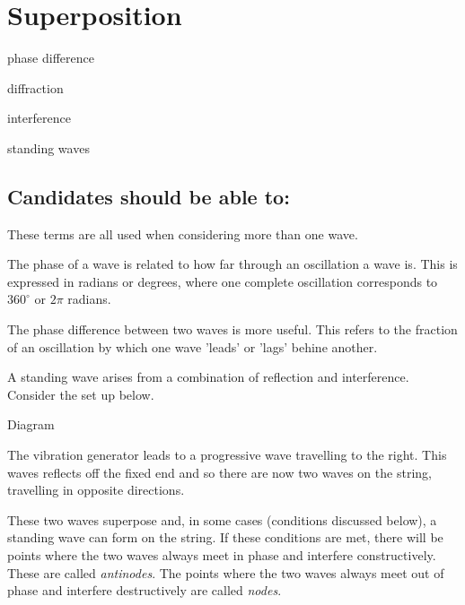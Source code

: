 \documentclass[main.tex]{subfiles}
\begin{document}
\chapter{Superposition}
\begin{content}
\item phase difference
\item diffraction
\item interference
\item standing waves
\end{content}

\section*{Candidates should be able to:}

These terms are all used when considering more than one wave.

The phase of a wave is related to how far through an oscillation a wave is. This is expressed in radians or degrees, where one complete oscillation corresponds to $360^{\circ}$ or $2\pi$ radians.

The phase difference between two waves is more useful. This refers to the fraction of an oscillation by which one wave 'leads' or 'lags' behine another.


A standing wave arises from a combination of reflection and interference. Consider the set up below. 

Diagram

The vibration generator leads to a progressive wave travelling to the right. This waves reflects off the fixed end and so there are now two waves on the string, travelling in opposite directions. 

These two waves superpose and, in some cases (conditions discussed below), a standing wave can form on the string. If these conditions are met, there will be points where the two waves always meet in phase and interfere constructively. These are called \emph{antinodes}. The points where the two waves always meet out of phase and interfere destructively are called \emph{nodes}.
\end{document}
